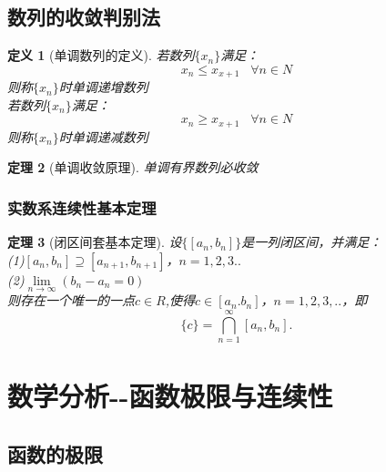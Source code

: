 \documentclass[12pt, a4paper, oneside]{ctexart}
\newtheorem{theorem}{定理}[section]
\newtheorem{definition}[theorem]{定义}
\begin{document}
\section{数列的收敛判别法}

\begin{definition}[单调数列的定义]
若数列$\{x_n\}$满足：
\begin{equation*}
    x_n \leq x_{x+1} \;\;\; \forall n\in N
\end{equation*}
则称$\{x_n\}$时单调递增数列\\
若数列$\{x_n\}$满足：
\begin{equation*}
    x_n \geq x_{x+1} \;\;\; \forall n\in N
\end{equation*}
则称$\{x_n\}$时单调递减数列
\end{definition}

\begin{theorem}[单调收敛原理]
单调有界数列必收敛
\end{theorem}

\subsection{实数系连续性基本定理}

\begin{theorem}[闭区间套基本定理]
设$\{[a_n,b_n]\}$是一列闭区间，并满足：\\
(1)$[a_n,b_n] \supseteq [a_{n+1},b_{n+1}]$，$n=1,2,3..$\\
(2)$\lim\limits_{n\to \infty }(b_n-a_n=0)$\\
则存在一个唯一的一点$c \in R $,使得$c \in [a_n.b_n]$，$n=1,2,3,..$，即
\begin{equation*}
    \{c\}=\bigcap_{n=1}^{\infty}[a_n,b_n].
\end{equation*}

\end{theorem}






\clearpage

\chapter{数学分析-\uppercase\expandafter{}-函数极限与连续性}

\section{函数的极限}
\end{document}
